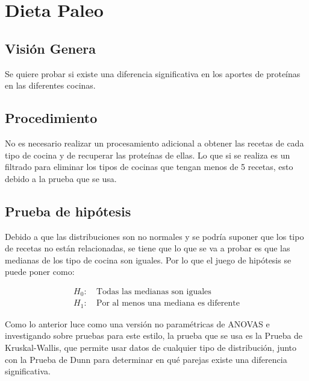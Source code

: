 \documentclass[12pt,a4paper]{article}
\begin{document}
    \section{Dieta Paleo}
    {
        \subsection{Visión Genera}
        {
            Se quiere probar si existe una diferencia significativa en los 
            aportes de proteínas en las diferentes cocinas.
        }

        \subsection{Procedimiento}
        {
            No es necesario realizar un procesamiento adicional a obtener las 
            recetas de cada tipo de cocina y de recuperar las proteínas	de ellas. Lo 
            que si se realiza es un filtrado para eliminar los tipos de cocinas 
            que tengan menos de 5 recetas, esto debido a la prueba que se usa.
        }

        \subsection{Prueba de hipótesis}
        {
            Debido a que las distribuciones son no normales y se podría suponer que 
            los tipo de recetas no están relacionadas, se tiene que lo que se va a probar 
            es que las medianas de los tipo de cocina son iguales. Por lo que el juego de hipótesis 
            se puede poner como:
        
            \begin{align*}
                H_0 :&\ \text{Todas las medianas son iguales} \\ 
                H_1 :&\ \text{Por al menos una mediana es diferente}
            \end{align*}

            Como lo anterior luce como una versión no paramétricas de ANOVAS e investigando 
            sobre pruebas para este estilo, la prueba que se usa es la Prueba de Kruskal-Wallis, 
            que permite usar datos de cualquier tipo de distribución, junto con la Prueba de Dunn 
            para determinar en qué parejas existe una diferencia significativa.
        }
    }

    \newpage
\end{document}
